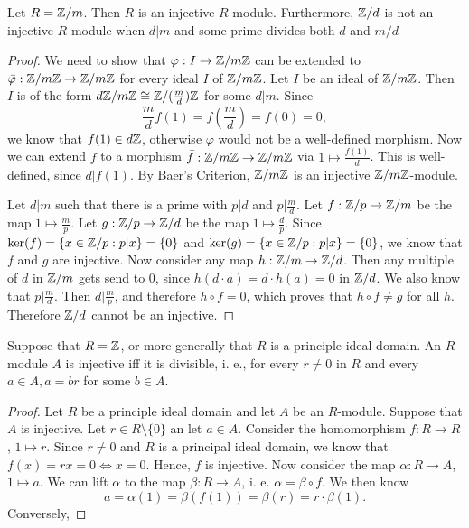 \begin{exercise}
	Let $R={\mathbb Z}/m$. Then $R$ is an injective $R$-module.
	Furthermore, ${\mathbb Z}/d$ is not an injective $R$-module when $d\vert m$ and some prime divides both $d$ and $m/d$
\end{exercise}

\begin{proof}
	We need to show that $\varphi: I \rightarrow {\mathbb Z}/m{\mathbb Z}$ can be extended to $\bar{\varphi}: {\mathbb Z}/m{\mathbb Z} \rightarrow {\mathbb Z}/m{\mathbb Z}$ for every ideal $I$ of ${\mathbb Z}/m{\mathbb Z}$.
	Let $I$ be an ideal of ${\mathbb Z}/m{\mathbb Z}$.
	Then $I$ is of the form $d{\mathbb Z}/m{\mathbb Z} \cong {\mathbb Z}/(\frac{m}{d}){\mathbb Z}$ for some $d \vert m$.
	Since \[\frac{m}{d}f(1) = f(\frac{m}{d}) = f(0) = 0,\]
	we know that $f(1) \in d{\mathbb Z}$, otherwise $\varphi$ would not be a well-defined morphism.
	Now we can extend $f$ to a morphism $\bar{f}: {\mathbb Z}/m{\mathbb Z} \rightarrow {\mathbb Z}/m{\mathbb Z}$ via $1 \mapsto \frac{f(1)}{d}$.
	This is well-defined, since $d \vert f(1)$.
	By Baer's Criterion, ${\mathbb Z}/m{\mathbb Z}$ is an injective ${\mathbb Z}/m{\mathbb Z}$-module.
	
	Let $d\vert m$ such that there is a prime with $p \vert d$ and $p \vert \frac{m}{d}$.
	Let $f: {\mathbb Z}/p \rightarrow {\mathbb Z}/m$ be the map $1 \mapsto \frac{m}{p}$.
	Let $g: {\mathbb Z}/p \rightarrow {\mathbb Z}/d$ be the map $1 \mapsto \frac{d}{p}$.
	Since $\ker(f) = \{x \in {\mathbb Z}/p : p \vert x\} = \{0\}$ and $\ker(g) = \{x \in {\mathbb Z}/p : p \vert x\} = \{0\}$, we know that $f$ and $g$ are injective.
	Now consider any map $h: {\mathbb Z}/m \rightarrow {\mathbb Z}/d$.
	Then any multiple of $d$ in ${\mathbb Z}/m$ gets send to $0$, since $h(d\cdot a) = d \cdot h(a) = 0$ in ${\mathbb Z}/d$.
	We also know that $p \vert \frac{m}{d}$.
	Then $d \vert \frac{m}{p}$, and therefore $h\circ f= 0$, which proves that $h\circ f \neq g$ for all $h$.
	Therefore ${\mathbb Z}/d$ cannot be an injective.
\end{proof}

\begin{corollary}
	Suppose that $R={\mathbb Z}$, or more generally that $R$ is a principle ideal domain. An $R$-module $A$ is injective iff it is divisible, i. e., for every $r\neq0$ in $R$ and every $a\in A, a=br$ for some $b\in A$.
\end{corollary}

\begin{proof}
	Let $R$ be a principle ideal domain and let $A$ be an $R$-module.
	Suppose that $A$ is injective.
	Let $r \in R\setminus\{0\}$ an let $a \in A$.
	Consider the homomorphism $f: R \rightarrow R$, $1 \mapsto r$.
	Since $r\neq0$ and $R$ is a principal ideal domain, we know that $f(x) = rx  = 0 \iff x = 0$.
	Hence, $f$ is injective.
	Now consider the map $\alpha: R \rightarrow A$, $1 \mapsto a$.
	We can lift $\alpha$ to the map $\beta: R \rightarrow A$, i. e. $\alpha = \beta\circ f$.
	We then know
	\[a = \alpha(1) = \beta(f(1)) = \beta(r) = r \cdot \beta(1).\]
	Conversely, 
\end{proof}

